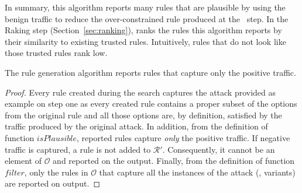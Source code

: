 \documentclass[sigconf,review, anonymous]{acmart}
\begin{document}
In summary, this algorithm reports many rules that are plausible by
using the benign traffic to reduce the over-constrained rule produced
at the \reveng\ step. In the Raking step (Section~\ref{sec:ranking}),
\tname{} ranks the rules this algorithm reports by their similarity to
existing trusted rules. Intuitively, rules that do not look like those
trusted rules rank low.

\begin{proposition}
  \vspace{-1ex}  
  The rule generation algorithm reports rules that capture only the
  positive traffic.
\end{proposition}
\begin{proof}
  \vspace{-1.5ex} Every rule created during the search captures the
  attack provided as example on step one as every created rule
  contains a proper subset of the options from the original rule and
  all those options are, by definition, satisfied by the traffic
  produced by the original attack. In addition, from the definition of
  function $\mathit{isPlausible}$, reported rules capture \emph{only}
  the positive traffic. If negative traffic is captured, a rule is not
  added to $\mathcal R'$. Consequently, it cannot be an element of
  $\mathcal O$ and reported on the output. Finally, from the
  definition of function $\mathit{filter}$, only the rules in
  $\mathcal O$ that capture all the instances of the attack (\ie{},
  variants) are reported on output.
  \vspace{-1ex}    
\end{proof}



\end{document}
